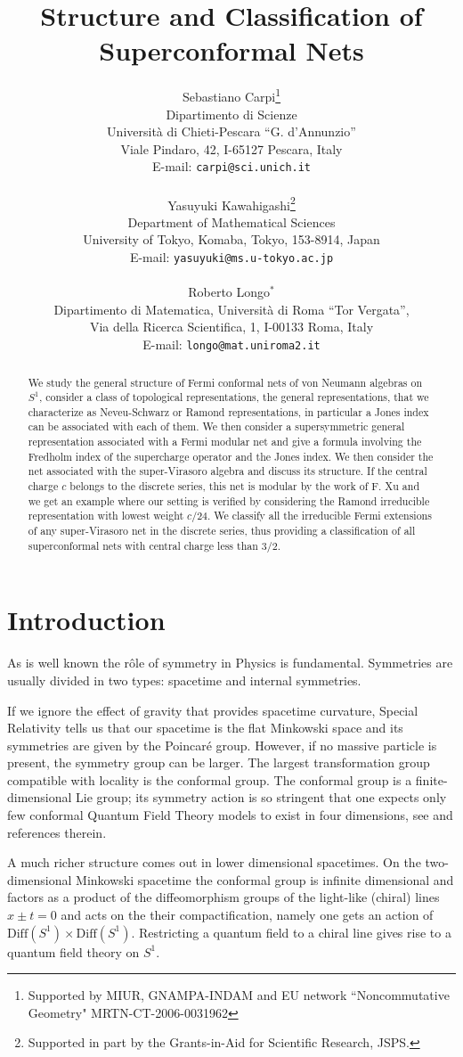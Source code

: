 \documentclass[11pt]{article}
\title{{\Huge Structure and Classification of Superconformal Nets}}
\author{
{\sc Sebastiano Carpi}\footnote{Supported by MIUR, GNAMPA-INDAM and EU network ``Noncommutative Geometry" 
MRTN-CT-2006-0031962}\\
Dipartimento di Scienze\\
Universit\`a di Chieti-Pescara ``G. d'Annunzio''\\
Viale Pindaro, 42, I-65127 Pescara, Italy\\
E-mail: {\tt carpi@sci.unich.it}\\
\phantom{X}\\
{\sc Yasuyuki Kawahigashi}\footnote{Supported in part by the
Grants-in-Aid for Scientific Research, JSPS.}\\
Department of Mathematical Sciences\\
University of Tokyo, Komaba, Tokyo, 153-8914, Japan\\
E-mail: {\tt yasuyuki@ms.u-tokyo.ac.jp}\\
\phantom{X}\\
{\sc Roberto Longo}$^*$
\\
Dipartimento di Matematica,
Universit\`a di Roma ``Tor Vergata'',\\
Via della Ricerca Scientifica, 1, I-00133 Roma, Italy\\
E-mail: {\tt longo@mat.uniroma2.it}}
\def\Diff{{\rm Diff}}
\def\Diff{{\mathrm {Diff}}}
\begin{document}
\date{}
\maketitle

\begin{abstract}
We study the general structure of Fermi conformal nets of von Neumann algebras on $S^1$, consider a class of topological representations, the general representations, that we characterize as Neveu-Schwarz or Ramond representations, in particular a Jones index can be associated with each of them. We then consider a supersymmetric general representation associated with a Fermi modular net and give a formula involving the Fredholm index of the supercharge operator and the Jones index. We then consider the net associated with the super-Virasoro algebra and discuss its structure. If the central charge $c$ belongs to the discrete series, this net is modular by the work of F. Xu and we get an example where our setting is verified by considering the Ramond irreducible representation with lowest weight $c/24$. We classify all the irreducible Fermi extensions of any super-Virasoro net in the discrete series, thus providing a classification of all superconformal nets with central charge less than $3/2$.
\end{abstract}
%
\newpage
{\small\tableofcontents}
%
\section{Introduction}
As is well known the r\^ole of symmetry in Physics is fundamental. Symmetries are usually divided in two types: spacetime and internal symmetries. 

If we ignore the effect of gravity that provides spacetime curvature, Special Relativity tells us that our spacetime is the flat Minkowski space and its symmetries are given by the Poincar\'e group. However, if no massive particle is present, the symmetry group can be larger. The largest transformation group compatible with locality is the conformal group. The conformal group is a finite-dimensional Lie group; its symmetry action is so stringent that one expects only few conformal Quantum Field Theory models to exist in four dimensions, see \cite{BRNT} and references therein.

A much richer structure comes out in lower dimensional spacetimes. On the two-dimensional Minkowski spacetime the conformal group is infinite dimensional and factors as a product of the diffeomorphism groups of the light-like (chiral) lines $x\pm t=0$ and acts on the their compactification, namely one gets an action of $\Diff(S^1)\times\Diff(S^1)$. Restricting a quantum field to a chiral line gives rise to a quantum field theory on $S^1$. 
\end{document}
